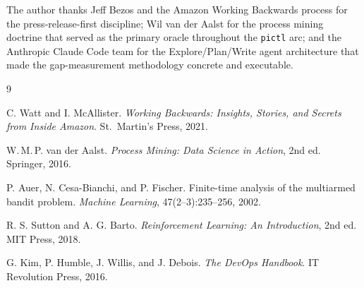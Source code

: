 \documentclass[11pt,a4paper]{article}
\newcommand{\code}[1]{\texttt{#1}}
\begin{document}
The author thanks Jeff Bezos and the Amazon Working Backwards process for the
press-release-first discipline; Wil van der Aalst for the process mining
doctrine that served as the primary oracle throughout the \code{pictl} arc; and
the Anthropic Claude Code team for the Explore/Plan/Write agent architecture
that made the gap-measurement methodology concrete and executable.

\begin{thebibliography}{9}

C. Watt and I. McAllister.
\textit{Working Backwards: Insights, Stories, and Secrets from Inside Amazon}.
St.\ Martin's Press, 2021.

W.\,M.\,P. van der Aalst.
\textit{Process Mining: Data Science in Action}, 2nd ed.
Springer, 2016.

P. Auer, N. Cesa-Bianchi, and P. Fischer.
Finite-time analysis of the multiarmed bandit problem.
\textit{Machine Learning}, 47(2--3):235--256, 2002.

R. S. Sutton and A. G. Barto.
\textit{Reinforcement Learning: An Introduction}, 2nd ed.
MIT Press, 2018.

G. Kim, P. Humble, J. Willis, and J. Debois.
\textit{The DevOps Handbook}.
IT Revolution Press, 2016.

\end{thebibliography}
\end{document}
